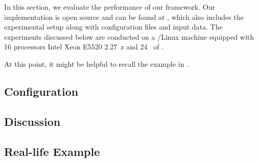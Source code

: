 In this section, we evaluate the performance of our framework. Our
implementation is open source and can be found at \cite{sources}, which also
includes the experimental setup along with configuration files and input data.
The experiments discussed below are conducted on a /Linux machine
equipped with 16 processors Intel Xeon E5520 2.27~z and 24~ of
.

 At this point, it might be helpful to
recall the example in .

\subsection{Configuration} 


\subsection{Discussion}


\subsection{Real-life Example}

